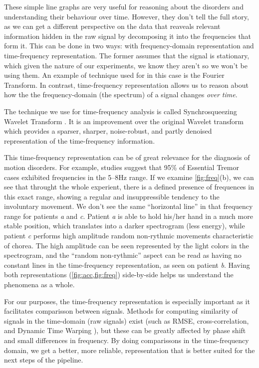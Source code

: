 These simple line graphs are very useful for reasoning about the disorders and understanding their behaviour over time. However, they don't tell the full story, as we can get a different perspective on the data that reaveals relevant information hidden in the raw signal by decomposing it into the frequencies that form it. This can be done in two ways: with frequency-domain representation and time-frequency representation. The former assumes that the signal is stationary, which given the nature of our experiments, we know they aren't so we won't be using them. An example of technique used for in this case is the Fourier Transform. In contrast, time-frequency representation allows us to reason about how the the frequency-domain (the spectrum) of a signal changes \textit{over time}.

The technique we use for time-frequency analysis is called Synchrosqueezing Wavelet Transform . It is an improvement over the original Wavelet transform  which provides a sparser, sharper, noise-robust, and partly denoised representation of the time-frequency information. 

This time-frequency representation can be of great relevance for the diagnosis of motion disorders. For example, studies suggest that 95\% of Essential Tremor cases exhibited frequencies in the 5--8Hz range. If we examine \cref{fig:freq}(b), we can see that throught the whole experient, there is a defined presence of frequences in this exact range, showing a regular and insuppressible tendency to the involuntary movement. We don't see the same ``horizontal line'' in that frequency range for patients \textit{a} and \textit{c}. Patient \textit{a} is able to hold his/her hand in a much more stable position, which translates into a darker spectrogram (less energy), while patient \textit{c} performs high amplitude random non-rythmic movements characteristic of chorea. The high amplitude can be seen represented by the light colors in the spectrogram, and the ``random non-rythmic'' aspect can be read as having no constant lines in the time-frequency representation, as seen on patient \textit{b}. Having both representations (\cref{fig:acc,fig:freq}) side-by-side helps us understand the phenomena as a whole. 

For our purposes, the time-frequency representation is especially important as it facilitates comparisson between signals. Methods for computing similarity of signals in the time-domain (raw signals) exist (such as RMSE, cross-correlation, and Dynamic Time Warping ), but these can be greatly affected by phase shift and small differences in frequency. By doing comparissons in the time-frequency domain, we get a better, more reliable, representation that is better suited for the next steps of the pipeline.

